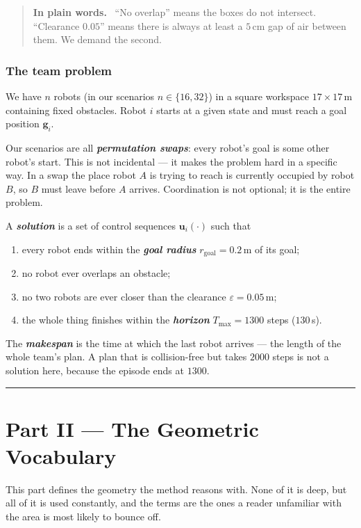 \documentclass[11pt,a4paper]{article}
\newcommand{\defn}[1]{\textbf{\textit{#1}}}
\newenvironment{keypoint}
  {\begin{quote}\small\noindent\textbf{In plain words.}\ }
  {\end{quote}}
\begin{document}
\begin{keypoint}
``No overlap'' means the boxes do not intersect. ``Clearance $0.05$'' means there is always
at least a $5$\,cm gap of air between them. We demand the second.
\end{keypoint}

\section{The team problem}

We have $n$ robots (in our scenarios $n \in \{16, 32\}$) in a square workspace $17 \times
17$\,m containing fixed obstacles. Robot $i$ starts at a given state and must reach a goal
position $\mathbf{g}_i$.

Our scenarios are all \defn{permutation swaps}: every robot's goal is some other robot's
start. This is not incidental --- it makes the problem hard in a specific way. In a swap the
place robot $A$ is trying to reach is currently occupied by robot $B$, so $B$ must leave
before $A$ arrives. Coordination is not optional; it is the entire problem.

A \defn{solution} is a set of control sequences $\mathbf{u}_i(\cdot)$ such that
\begin{enumerate}[nosep]
\item every robot ends within the \defn{goal radius} $r_{\mathrm{goal}} = 0.2$\,m of its
      goal;
\item no robot ever overlaps an obstacle;
\item no two robots are ever closer than the clearance $\varepsilon = 0.05$\,m;
\item the whole thing finishes within the \defn{horizon} $T_{\max} = 1300$ steps ($130$\,s).
\end{enumerate}

The \defn{makespan} is the time at which the last robot arrives --- the length of the whole
team's plan. A plan that is collision-free but takes $2000$ steps is not a solution here,
because the episode ends at $1300$.

\bigskip\hrule\bigskip

\part*{Part II --- The Geometric Vocabulary}

This part defines the geometry the method reasons with. None of it is deep, but all of it is
used constantly, and the terms are the ones a reader unfamiliar with the area is most likely
to bounce off.
\end{document}

